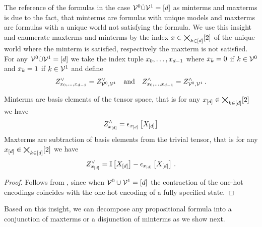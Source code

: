 %
The reference of the formulas in the case $\mathcal{V}^{0}\dot{\cup}\mathcal{V}^{1} = [d]$ as minterms and maxterms is due to the fact, that minterms are formulas with unique models and maxterms are formulas with a unique world not satisfying the formula.
We use this insight and enumerate maxterms and minterms by the index $x\in\bigtimes_{k\in[d]}[2]$ of the unique world where the minterm is satisfied, respectively the maxterm is not satisfied.
For any $\mathcal{V}^{0}\dot{\cup}\mathcal{V}^{1} = [d]$ we take the index tuple $x_{0},\ldots,x_{d-1}$ where $x_{k}=0$ if $k\in\mathcal{V}^{0}$ and $x_{k}=1$ if $k\in\mathcal{V}^{1}$ and define
\begin{align*}
    Z^{\lor}_{x_{0},\ldots,x_{d-1}} = Z^{\lor}_{\mathcal{V}^{0},\mathcal{V}^{1}} \quad\text{and}\quad Z^{\land}_{x_{0},\ldots,x_{d-1}} = Z^{\land}_{\mathcal{V}^{0},\mathcal{V}^{1}} \, .
\end{align*}


\begin{corollary}
    Minterms are basis elements of the tensor space, that is for any $x_{[d]}\in\bigtimes_{k\in[d]}[2]$ we have
    \begin{align*}
        Z^{\land}_{x_{[d]}} = \epsilon_{x_{[d]}}\left[X_{[d]}\right]
    \end{align*}
    Maxterms are subtraction of basis elements from the trivial tensor, that is for any $x_{[d]}\in\bigtimes_{k\in[d]}[2]$ we have
    \begin{align*}
        Z^{\lor}_{x_{[d]}} = \mathbb{I}\left[X_{[d]}\right] - \epsilon_{x_{[d]}}\left[X_{[d]}\right]  \, .
    \end{align*}
\end{corollary}
\begin{proof}
    Follows from , since when $\mathcal{V}^{0}\cup\mathcal{V}^{1} = [d]$ the contraction of the one-hot encodings coincides with the one-hot encoding of a fully specified state.
\end{proof}


Based on this insight, we can decompose any propositional formula into a conjunction of maxterms or a disjunction of minterms as we show next.


